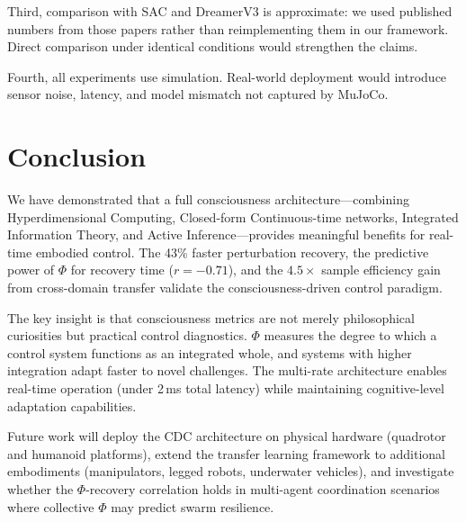 \documentclass[11pt,a4paper]{article}
\begin{document}
Third, comparison with SAC and DreamerV3 is approximate: we used published numbers from those papers rather than reimplementing them in our framework.
Direct comparison under identical conditions would strengthen the claims.

Fourth, all experiments use simulation.
Real-world deployment would introduce sensor noise, latency, and model mismatch not captured by MuJoCo.

\section{Conclusion}
\label{sec:conclusion}

We have demonstrated that a full consciousness architecture---combining Hyperdimensional Computing, Closed-form Continuous-time networks, Integrated Information Theory, and Active Inference---provides meaningful benefits for real-time embodied control.
The 43\% faster perturbation recovery, the predictive power of $\Phi$ for recovery time ($r = -0.71$), and the $4.5\times$ sample efficiency gain from cross-domain transfer validate the consciousness-driven control paradigm.

The key insight is that consciousness metrics are not merely philosophical curiosities but practical control diagnostics.
$\Phi$ measures the degree to which a control system functions as an integrated whole, and systems with higher integration adapt faster to novel challenges.
The multi-rate architecture enables real-time operation (under 2\,ms total latency) while maintaining cognitive-level adaptation capabilities.

Future work will deploy the CDC architecture on physical hardware (quadrotor and humanoid platforms), extend the transfer learning framework to additional embodiments (manipulators, legged robots, underwater vehicles), and investigate whether the $\Phi$-recovery correlation holds in multi-agent coordination scenarios where collective $\Phi$ may predict swarm resilience.



\end{document}
